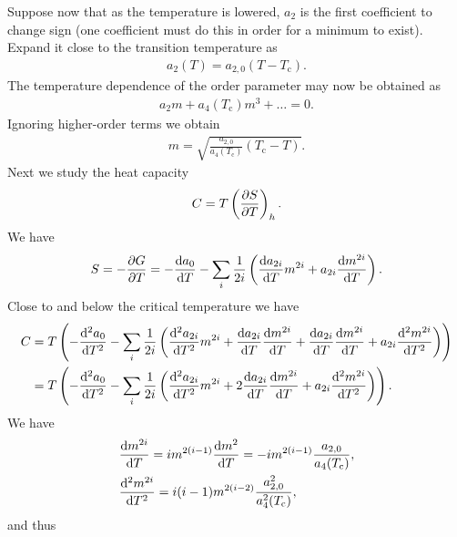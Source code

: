 Suppose now that as the temperature is lowered, $a_{2}$ is the first coefficient to change sign (one coefficient must do this in order for a minimum to exist). Expand it close to the transition temperature as
\begin{align*}
	a_{2}(T) = a_{2, 0}(T - T_{\text{c}}).
\end{align*}
The temperature dependence of the order parameter may now be obtained as
\begin{align*}
	a_{2}m + a_{4}(T_{\text{c}})m^{3} + \dots = 0.
\end{align*}
Ignoring higher-order terms we obtain
\begin{align*}
	m = \sqrt{\frac{a_{2, 0}}{a_{4}(T_{\text{c}})}(T_{\text{c}} - T)}.
\end{align*}
Next we study the heat capacity
\begin{align*}
	C = T\left(\pdv{S}{T}\right)_{h}.
\end{align*}
We have
\begin{align*}
	S = -\pdv{G}{T} = -\dv{a_{0}}{T} - \sum\limits_{i}\frac{1}{2i}\left(\dv{a_{2i}}{T}m^{2i} + a_{2i}\dv{m^{2i}}{T}\right).
\end{align*}
Close to and below the critical temperature we have
\begin{align*}
	C &= T\left(-\dv[2]{a_{0}}{T} - \sum\limits_{i}\frac{1}{2i}\left(\dv[2]{a_{2i}}{T}m^{2i} + \dv{a_{2i}}{T}\dv{m^{2i}}{T} + \dv{a_{2i}}{T}\dv{m^{2i}}{T} + a_{2i}\dv[2]{m^{2i}}{T}\right)\right) \\
	  &= T\left(-\dv[2]{a_{0}}{T} - \sum\limits_{i}\frac{1}{2i}\left(\dv[2]{a_{2i}}{T}m^{2i} + 2\dv{a_{2i}}{T}\dv{m^{2i}}{T} + a_{2i}\dv[2]{m^{2i}}{T}\right)\right).
\end{align*}
We have
\begin{align*}
	&\dv{m^{2i}}{T} = im^{2(i - 1)}\dv{m^{2}}{T} = -im^{2(i - 1)}\frac{a_{2, 0}}{a_{4}(T_{\text{c}})}, \\
	&\dv[2]{m^{2i}}{T} = i(i - 1)m^{2(i - 2)}\frac{a_{2, 0}^{2}}{a_{4}^{2}(T_{\text{c}})},
\end{align*}
and thus
